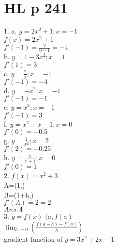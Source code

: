 \documentclass{article}
\begin{document}
  \section{HL p 241}
  1. a. $y=2x^2+1;x=-1$\\
  $f(x)=2x^2+1$\\
  $f'(-1)=\frac{2}{0-1}=-4$\\
  b. $y=1-3x^2;x=1$\\
  $f'(1)=3$\\
  c. $y=\frac{2}{x};x=-1$\\
  $f'(-1)=-4$\\
  d. $y=-x^2;x=-1$\\
  $f'(-1)=-1$\\
  e. $y=x^3;x=-1$\\
  $f'(-1)=3$\\
  f. $y=x^2+x-1;x=0$\\
  $f'(0)=-0.5$\\
  g. $y=\frac{1}{x^2};x=2$\\
  $f'(2)=-0.25$\\
  h. $y=\frac{x}{x+1};x=0$\\
  $f'(0)=1$\\ 
  2. $f(x)=x^2+3$\\
  A=(1,)\\
  B=(1+h,)\\
  $f'(A)=2=2$\\
  $Ans: 4$\\
  3. $y=f(x)$ $(a,f(a)$\\
  $\lim_{h\to 0}(\frac{f(a+h)-f(a)}{h})$\\
  gradient function of $y=3x^2+2x-1$\\
  
\end{document}

